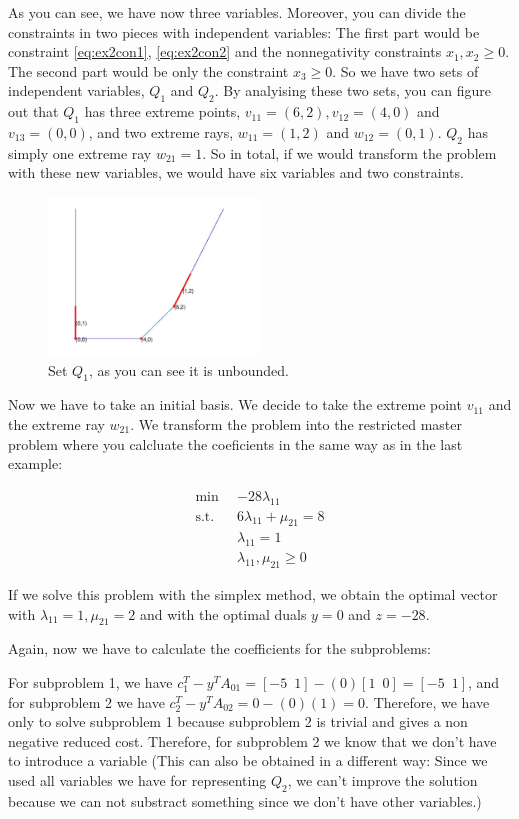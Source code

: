 \documentclass[a4paper,12pt]{article}
\begin{document}
As you can see, we have now three variables. Moreover, you can divide the constraints in two pieces with independent variables: The first part would be constraint \eqref{eq:ex2con1}, \eqref{eq:ex2con2} and the nonnegativity constraints $x_1, x_2 \geq 0$. The second part would be only the constraint $x_3 \geq 0$. So we have two sets of independent variables, $Q_1$ and $Q_2$. By analyising these two sets, you can figure out that $Q_1$ has three extreme points, $v_{11} = (6,2), v_{12} = (4,0)$ and $v_{13} = (0,0)$, and two extreme rays, $w_{11} = (1,2)$ and $w_{12} = (0,1)$. $Q_2$ has simply one extreme ray $w_{21} = 1$. So in total, if we would transform the problem with these new variables, we would have six variables and two constraints.

\begin{figure}[htbp] 
  \centering
     \includegraphics[width=0.5\textwidth]{q2.jpg}
  \caption{Set $Q_1$, as you can see it is unbounded.}
\end{figure}


Now we have to take an initial basis. We decide to take the extreme point $v_{11}$ and the extreme ray $w_{21}$. We transform the problem into the restricted master problem where you calcluate the coeficients in the same way as in the last example:

\begin{align*}
\min \enspace & -28\lambda_{11} \\
\text{s.t.} \enspace & 6\lambda_{11} + \mu_{21} = 8 \\
& \lambda_{11} = 1 \\
&\lambda_{11} , \mu_{21} \geq 0
\end{align*}

If we solve this problem with the simplex method, we obtain the optimal vector with $\lambda_{11} = 1, \mu_{21} = 2$ and with the optimal duals $y = 0$ and $z = -28$.

Again, now we have to calculate the coefficients for the subproblems: 

For subproblem 1, we have $c_1^T - y^TA _{01} = [ -5 \enspace 1] - (0)[1 \enspace 0] = [ -5 \enspace 1]$, and for subproblem 2 we have  $c_2^T - y^TA _{02} = 0 - (0)(1) = 0$. Therefore, we have only to solve subproblem 1 because subproblem 2 is trivial and gives a non negative reduced cost. Therefore, for subproblem 2 we know that we don't have to introduce a variable (This can also be obtained in a different way: Since we used all variables we have for representing $Q_2$, we can't improve the solution because we can not substract something since we don't have other variables.)
\end{document}
